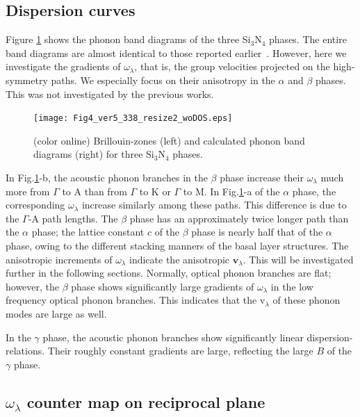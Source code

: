 \documentclass[twocolumn,amsmath,amssymb,a4paper,prb,superscriptaddress,floatfix]{revtex4-1}
\begin{document}
\subsection{Dispersion curves}

Figure \ref{fig:Fig4_ver5_338} shows the phonon band diagrams of the three
Si$_3$N$_4$ phases. The entire band diagrams are almost identical to those
reported earlier~\cite{kuwabara,xu}. However, here we investigate the gradients
of $\omega_\lambda$, that is, the group velocities projected on the
high-symmetry paths. We especially focus on their anisotropy in the $\alpha$ and
$\beta$ phases. This was not investigated by the previous works.

\begin{figure}[ht]
 \begin{center}
  \texttt{[image: Fig4\_ver5\_338\_resize2\_woDOS.eps]}
  \caption{(color online) Brillouin-zones (left) and calculated phonon band diagrams (right) for three Si$_3$N$_4$ phases.
  \label{fig:Fig4_ver5_338} }
 \end{center}
\end{figure}

In Fig.\ref{fig:Fig4_ver5_338}-b, the acoustic phonon branches in the $\beta$
phase increase their $\omega_\lambda$ much more from $\Gamma$ to A than from
$\Gamma$ to K or $\Gamma$ to M. In Fig.\ref{fig:Fig4_ver5_338}-a of the $\alpha$
phase, the corresponding $\omega_\lambda$ increase similarly among these paths.
This difference is due to the $\Gamma$-A path lengths.  The $\beta$ phase has an
approximately twice longer path than the $\alpha$ phase; the lattice constant
$c$ of the $\beta$ phase is nearly half that of the $\alpha$ phase, owing to the
different stacking manners of the basal layer structures.  The anisotropic
increments of $\omega_\lambda$ indicate the anisotropic $\mathbf{v}_\lambda$.
This will be investigated further in the following sections.  Normally, optical
phonon branches are flat; however, the $\beta$ phase shows significantly large
gradients of $\omega_\lambda$ in the low frequency optical phonon branches.
This indicates that the \rm{v}$_{\lambda}$ of these phonon modes are large as
well.

In the $\gamma$ phase, the acoustic phonon branches show significantly linear
dispersion-relations.  Their roughly constant gradients are large, reflecting
the large $B$ of the $\gamma$ phase.

\subsection{$\omega_\lambda$ counter map on reciprocal plane}
\end{document}
